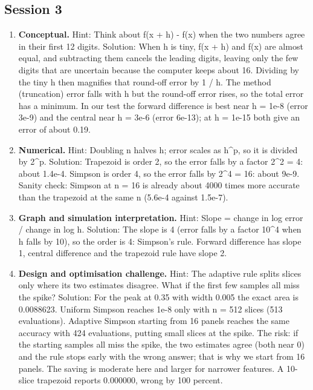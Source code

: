 \documentclass[11pt,a4paper]{article}
\begin{document}
\subsection*{Session 3}
\begin{enumerate}[nosep]
\item \textbf{Conceptual.} Hint: Think about f(x + h) - f(x) when the two numbers agree in their first 12 digits. Solution: When h is tiny, f(x + h) and f(x) are almost equal, and subtracting them cancels the leading digits, leaving only the few digits that are uncertain because the computer keeps about 16. Dividing by the tiny h then magnifies that round-off error by 1 / h. The method (truncation) error falls with h but the round-off error rises, so the total error has a minimum. In our test the forward difference is best near h = 1e-8 (error 3e-9) and the central near h = 3e-6 (error 6e-13); at h = 1e-15 both give an error of about 0.19.
\item \textbf{Numerical.} Hint: Doubling n halves h; error scales as h\textasciicircum{}p, so it is divided by 2\textasciicircum{}p. Solution: Trapezoid is order 2, so the error falls by a factor 2\textasciicircum{}2 = 4: about 1.4e-4. Simpson is order 4, so the error falls by 2\textasciicircum{}4 = 16: about 9e-9. Sanity check: Simpson at n = 16 is already about 4000 times more accurate than the trapezoid at the same n (5.6e-4 against 1.5e-7).
\item \textbf{Graph and simulation interpretation.} Hint: Slope = change in log error / change in log h. Solution: The slope is 4 (error falls by a factor 10\textasciicircum{}4 when h falls by 10), so the order is 4: Simpson's rule. Forward difference has slope 1, central difference and the trapezoid rule have slope 2.
\item \textbf{Design and optimisation challenge.} Hint: The adaptive rule splits slices only where its two estimates disagree. What if the first few samples all miss the spike? Solution: For the peak at 0.35 with width 0.005 the exact area is 0.0088623. Uniform Simpson reaches 1e-8 only with n = 512 slices (513 evaluations). Adaptive Simpson starting from 16 panels reaches the same accuracy with 424 evaluations, putting small slices at the spike. The risk: if the starting samples all miss the spike, the two estimates agree (both near 0) and the rule stops early with the wrong answer; that is why we start from 16 panels. The saving is moderate here and larger for narrower features. A 10-slice trapezoid reports 0.000000, wrong by 100 percent.
\end{enumerate}
\end{document}
